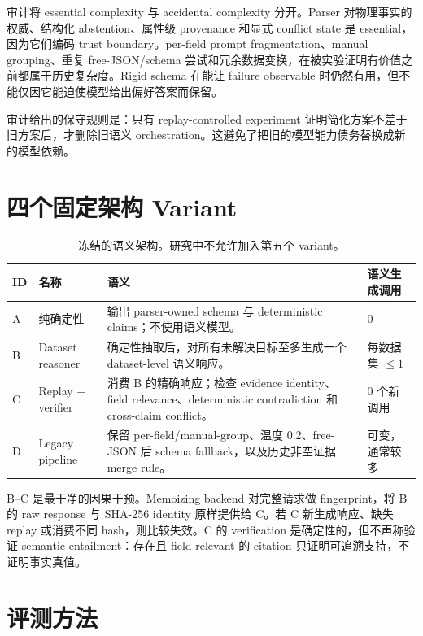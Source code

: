 \documentclass[UTF8,fontset=fandol,11pt]{ctexart}
\begin{document}
审计将 essential complexity 与 accidental complexity 分开。Parser 对物理事实的权威、结构化 abstention、属性级 provenance 和显式 conflict state 是 essential，因为它们编码 trust boundary。per-field prompt fragmentation、manual grouping、重复 free-JSON/schema 尝试和冗余数据变换，在被实验证明有价值之前都属于历史复杂度。Rigid schema 在能让 failure observable 时仍然有用，但不能仅因它能迫使模型给出偏好答案而保留。

审计给出的保守规则是：只有 replay-controlled experiment 证明简化方案不差于旧方案后，才删除旧语义 orchestration。这避免了把旧的模型能力债务替换成新的模型依赖。

\section{四个固定架构 Variant}

\begin{table}[H]
\centering
\caption{冻结的语义架构。研究中不允许加入第五个 variant。}
\label{tab:variants-zh}
\begin{tabularx}{\textwidth}{@{}p{0.8cm}p{3.0cm}Yp{2.3cm}@{}}
\toprule
ID & 名称 & 语义 & 语义生成调用 \\
\midrule
A & 纯确定性 & 输出 parser-owned schema 与 deterministic claims；不使用语义模型。 & 0 \\
B & Dataset reasoner & 确定性抽取后，对所有未解决目标至多生成一个 dataset-level 语义响应。 & 每数据集 $\leq1$ \\
C & Replay + verifier & 消费 B 的精确响应；检查 evidence identity、field relevance、deterministic contradiction 和 cross-claim conflict。 & 0 个新调用 \\
D & Legacy pipeline & 保留 per-field/manual-group、温度 0.2、free-JSON 后 schema fallback，以及历史非空证据 merge rule。 & 可变，通常较多 \\
\bottomrule
\end{tabularx}
\end{table}

B--C 是最干净的因果干预。Memoizing backend 对完整请求做 fingerprint，将 B 的 raw response 与 SHA-256 identity 原样提供给 C。若 C 新生成响应、缺失 replay 或消费不同 hash，则比较失效。C 的 verification 是确定性的，但不声称验证 semantic entailment：存在且 field-relevant 的 citation 只证明可追溯支持，不证明事实真值。

\section{评测方法}
\end{document}
